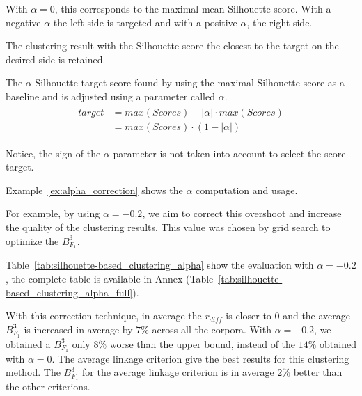 With $\alpha = 0$, this corresponds to the maximal mean Silhouette score.
With a negative $\alpha$ the left side is targeted and with a positive $\alpha$, the right side.

The clustering result with the Silhouette score the closest to the target on the desired side is retained.

\begin{definition}
  The $\alpha$-Silhouette target score found by using the maximal Silhouette score as a baseline and is adjusted using a parameter called $\alpha$.
  \begin{gather*}
    \begin{aligned}
    target &= max(Scores) - |\alpha| \cdot max(Scores) \\
           &= max(Scores) \cdot (1 - |\alpha|)
    \end{aligned}
  \end{gather*}

  Notice, the sign of the $\alpha$ parameter is not taken into account to select the score target.
\end{definition}

Example~\ref{ex:alpha_correction} shows the $\alpha$ computation and usage.

For example, by using $\alpha = -0.2$, we aim to correct this overshoot and increase the quality of the clustering results.
This value was chosen by grid search to optimize the $B^3_{F_1}$.

Table~\ref{tab:silhouette-based_clustering_alpha} show the evaluation with $\alpha = -0.2$, the complete table is available in Annex (Table~\ref{tab:silhouette-based_clustering_alpha_full}).

With this correction technique, in average the $r_{diff}$ is closer to 0 and the average $B^3_{F_1}$ is increased in average by $7\%$ across all the corpora.
With $\alpha = -0.2$, we obtained a $B^3_{F_1}$ only $8\%$ worse than the upper bound, instead of the $14\%$ obtained with $\alpha=0$.
The average linkage criterion give the best results for this clustering method.
The $B^3_{F_1}$ for the average linkage criterion is in average $2\%$ better than the other criterions.

